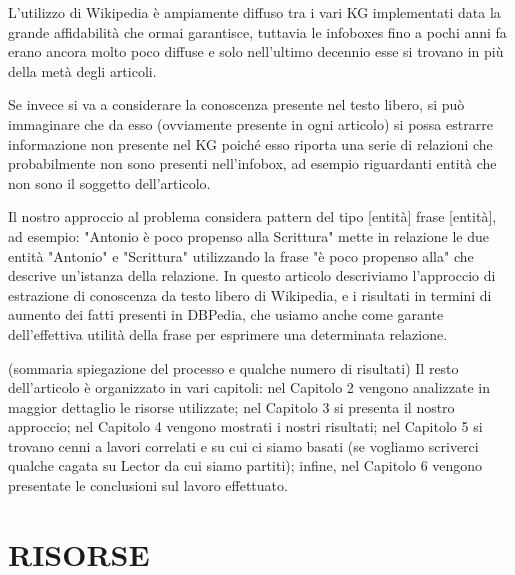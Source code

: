 \documentclass[10pt,a4paper,twocolumn]{article}
\begin{document}
L'utilizzo di Wikipedia è ampiamente diffuso tra i vari KG implementati data la grande affidabilità che ormai garantisce, tuttavia le infoboxes fino a pochi anni fa erano ancora molto poco diffuse e solo nell'ultimo decennio esse si trovano in più della metà degli articoli.

Se invece si va a considerare la conoscenza presente nel testo libero, si può immaginare che da esso (ovviamente presente in ogni articolo) si possa estrarre informazione non presente nel KG poiché esso riporta una serie di relazioni che probabilmente non sono presenti nell'infobox, ad esempio riguardanti entità che non sono il soggetto dell'articolo.

Il nostro approccio al problema considera pattern del tipo [entità] frase [entità], ad esempio: "Antonio è poco propenso alla Scrittura" mette in relazione le due entità "Antonio" e "Scrittura" utilizzando la frase "è poco propenso alla" che descrive un'istanza della relazione.
In questo articolo descriviamo l'approccio di estrazione di conoscenza da testo libero di Wikipedia, e i risultati in termini di aumento dei fatti presenti in DBPedia, che usiamo anche come garante dell'effettiva utilità della frase per esprimere una determinata relazione.

(sommaria spiegazione del processo e qualche numero di risultati)
Il resto dell'articolo è organizzato in vari capitoli: nel Capitolo 2 vengono analizzate in maggior dettaglio le risorse utilizzate; nel Capitolo 3 si presenta il nostro approccio; nel Capitolo 4 vengono mostrati i nostri risultati; nel Capitolo 5 si trovano cenni a lavori correlati e su cui ci siamo basati (se vogliamo scriverci qualche cagata su Lector da cui siamo partiti); infine, nel Capitolo 6 vengono presentate le conclusioni sul lavoro effettuato.

\section{RISORSE}
\end{document}
